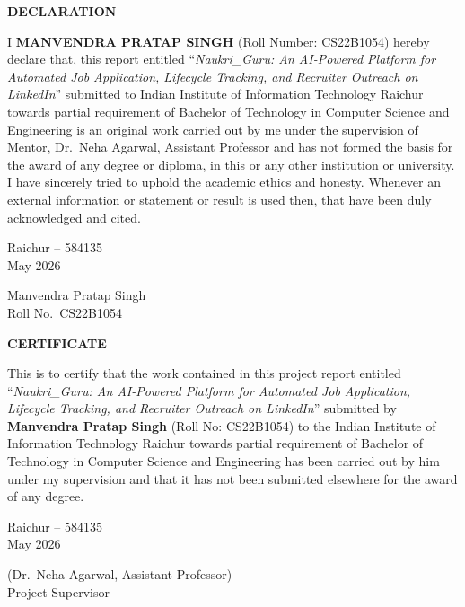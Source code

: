 \documentclass[12pt, a4paper, oneside]{report}
\newcommand{\thesisTitle}{Naukri\_Guru: An AI-Powered Platform for Automated Job Application, Lifecycle Tracking, and Recruiter Outreach on LinkedIn}
\newcommand{\studentName}{Manvendra Pratap Singh}
\newcommand{\rollNumber}{CS22B1054}
\newcommand{\supervisorName}{Dr.~Neha Agarwal, Assistant Professor}
\newcommand{\departmentName}{Computer Science and Engineering}
\newcommand{\submissionMonthYear}{May 2026}
\newcommand{\submissionLocation}{Raichur -- 584135}
\newcommand{\degreeName}{Bachelor of Technology}
\newcommand{\frontmatterheading}[1]{%
  \begin{center}\Large\bfseries #1\end{center}
  \vspace{0.5cm}
}
\begin{document}
\setcounter{page}{2}

\clearpage
\thispagestyle{plain}
\frontmatterheading{DECLARATION}

\noindent I \textbf{\MakeUppercase{\studentName}} (Roll Number: \rollNumber) hereby
declare that, this report entitled ``\textit{\thesisTitle}'' submitted to
Indian Institute of Information Technology Raichur towards partial requirement
of \degreeName{} in \departmentName{} is an original work carried out by me
under the supervision of Mentor, \supervisorName{} and has not formed the
basis for the award of any degree or diploma, in this or any other institution
or university. I have sincerely tried to uphold the academic ethics and
honesty. Whenever an external information or statement or result is used then,
that have been duly acknowledged and cited.

\vspace{2.5cm}
\noindent
\begin{minipage}[t]{0.5\textwidth}
\submissionLocation \\
\submissionMonthYear
\end{minipage}
\hfill
\begin{minipage}[t]{0.4\textwidth}
\raggedleft
\studentName \\
Roll No.~\rollNumber
\end{minipage}

\clearpage
\thispagestyle{plain}
\frontmatterheading{CERTIFICATE}

\noindent This is to certify that the work contained in this project report
entitled ``\textit{\thesisTitle}'' submitted by \textbf{\studentName} (Roll
No: \rollNumber) to the Indian Institute of Information Technology Raichur
towards partial requirement of \degreeName{} in \departmentName{} has been
carried out by him under my supervision and that it has not been submitted
elsewhere for the award of any degree.

\vspace{3cm}
\noindent
\begin{minipage}[t]{0.5\textwidth}
\submissionLocation \\
\submissionMonthYear
\end{minipage}
\hfill
\begin{minipage}[t]{0.4\textwidth}
\raggedleft
(\supervisorName) \\
Project Supervisor
\end{minipage}
\end{document}
